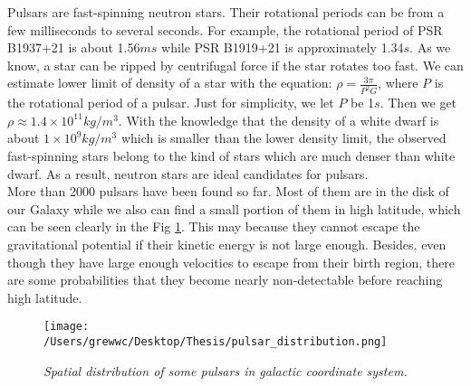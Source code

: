\documentclass[12pt]{report}
\newcommand{\add}[1]{
  $<$\colorbox{red}{\textbf{add}}$>$#1$<$\colorbox{red}{\textbf{/add}}$>$
}
\begin{document}
        Pulsars are fast-spinning neutron stars. Their rotational periods can be from a few 
        milliseconds
        to several seconds. For example, the rotational period of PSR B1937+21 is about 1.56$ms$ while 
        PSR B1919+21 is approximately 1.34$s$. As we know, a star can be ripped by centrifugal force if the
        star rotates too fast. We can estimate lower limit of density of a star with the equation: 
        $\rho=\frac{3\pi}{P^2G}$, where $P$ is the rotational period of a pulsar. Just for simplicity, we
        let $P$ be 1$s$. Then we get $\rho\approx 1.4\times 10^{11}kg/m^3$. With the knowledge  that the 
        density of a white dwarf is about $1\times 10^9kg/m^3$ which is smaller than the lower density limit,
        the observed fast-spinning stars belong to the kind of stars which are much denser 
        than white dwarf. As a result, neutron stars are ideal candidates for pulsars. \\
        \indent
        More than 2000 pulsars have been found so far. Most of them are in the disk of our Galaxy while we also can 
        find a small portion of them in high latitude, which can be seen clearly in the Fig 
        \ref{fig: spatial_distribution}. This may 
        because they cannot escape the gravitational potential if their kinetic energy is not large enough. Besides,
        even though they have large enough velocities to escape from their birth region, there are some 
        probabilities that they become nearly non-detectable before reaching high latitude. 

        \begin{figure}[h]
          \centering
          \texttt{[image: /Users/grewwc/Desktop/Thesis/pulsar\_distribution.png]}
          \caption{\textit{\footnotesize Spatial distribution of some pulsars in galactic coordinate system.}}
          \label{fig: spatial_distribution}
        \end{figure}
        



\end{document}
